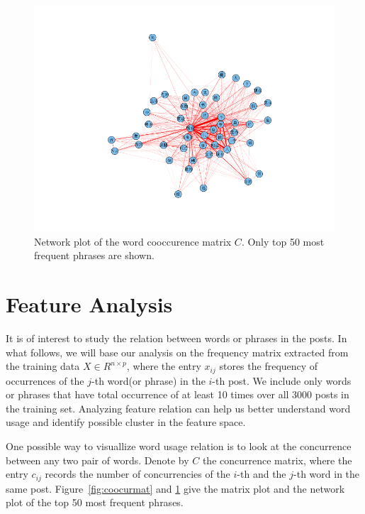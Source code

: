 \documentclass[11pt]{article}
\newcommand{\1}[1]{{\mathbf 1}\left\{#1\right\}}        %
\begin{document}
\begin{center}
\begin{figure}[tb]
   \centering
   \includegraphics[width=\textwidth]{../coocurResults/cooccurNetwork.png} 
      \caption{Network plot of the word cooccurence matrix $C$. Only top 50 most frequent phrases are shown.}
   \label{fig:coocur}
\end{figure}
\end{center}


\section{Feature Analysis}
It is of interest to study the relation between words or phrases in the posts. In what follows, we will base our analysis on the frequency matrix extracted from the training data $X\in R^{n\times p}$, where the entry $x_{ij}$ stores the frequency of occurrences of the $j$-th word(or phrase) in the $i$-th post. We include only words or phrases that have total occurrence of at least 10 times over all 3000 posts in the training set. Analyzing feature relation can help us better understand word usage and identify possible cluster in the feature space. 

One possible way to visuallize word usage relation is to look at the concurrence between any two pair of words. Denote by $C$ the concurrence matrix, where the entry $c_{ij}$ records the number of concurrencies of the $i$-th and the $j$-th word in the same post. Figure~\ref{fig:coocurmat} and \ref{fig:coocur} give the matrix plot and the network plot of the top 50 most frequent phrases. 
\end{document}
